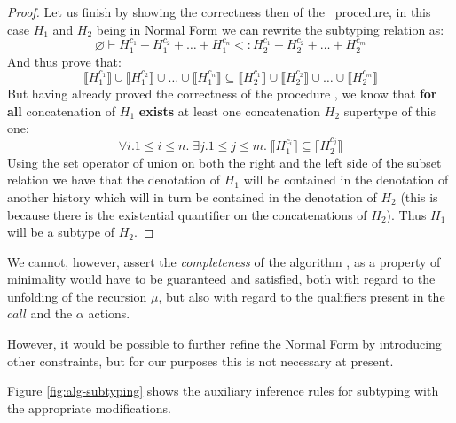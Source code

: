 \begin{proof}
    Let us finish by showing the correctness then of the \subhist\ procedure, in this case $H_1$ and $H_2$ being in Normal Form we can rewrite the subtyping relation as:
    \begin{equation}
        \varnothing \vdash H_1^{c_1} + H_1^{c_2} + \dots + H_1^{c_n} <: H_2^{c_1} + H_2^{c_2} + \dots + H_2^{c_m}
    \end{equation}
    And thus prove that:
    \begin{equation}
        \llbracket H_1^{c_1} \rrbracket \cup \llbracket H_1^{c_2} \rrbracket \cup \dots \cup \llbracket H_1^{c_n} \rrbracket \subseteq \llbracket H_2^{c_1} \rrbracket \cup \llbracket H_2^{c_2} \rrbracket \cup \dots \cup \llbracket H_2^{c_m} \rrbracket
    \end{equation}
    But having already proved the correctness of the procedure \subconc, we know that \textbf{for all} concatenation of $H_1$ \textbf{exists} at least one concatenation $H_2$ supertype of this one:
    \begin{equation}
        \forall i. 1 \leq i \leq n. \;\exists j. 1 \leq j \leq m. \;\llbracket H_1^{c_i} \rrbracket \subseteq \llbracket H_2^{c_j} \rrbracket
    \end{equation}
    Using the set operator of union on both the right and the left side of the subset relation we have that the denotation of $H_1$ will be contained in the denotation of another history which will in turn be contained in the denotation of $H_2$ (this is because there is the existential quantifier on the concatenations of $H_2$). Thus $H_1$ will be a subtype of $H_2$.
\end{proof}

We cannot, however, assert the \emph{completeness} of the algorithm \subconc, as a property of minimality would have to be guaranteed and satisfied, both with regard to the unfolding of the recursion $\mu$, but also with regard to the qualifiers present in the $call$ and the $\alpha$ actions.

However, it would be possible to further refine the Normal Form by introducing other constraints, but for our purposes this is not necessary at present.

Figure \ref{fig:alg-subtyping} shows the auxiliary inference rules for subtyping with the appropriate modifications.

